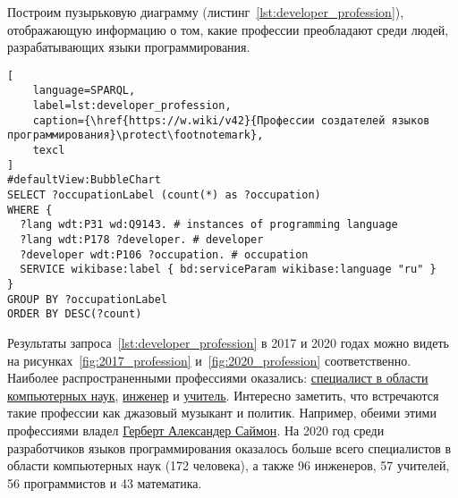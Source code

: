 \begin{marginfigure}[-102pt]
{
\setlength{\fboxsep}{0pt}
\setlength{\fboxrule}{1pt}
}
  \caption{Профессии разработчиков языков программирования, 2017 год. Размер пузырька показывает число разработчиков с соответствуюшей профессией.}
  \label{fig:2017_profession}
\end{marginfigure}
\begin{marginfigure}[-2pt]
{
\setlength{\fboxsep}{0pt}
\setlength{\fboxrule}{1pt}
}
  \caption{Профессии разработчиков языков программирования программирования, 2020 год. Размер пузырька показывает число разработчиков с соответствуюшей профессией.}
  \label{fig:2020_profession}
\end{marginfigure}
Построим пузырьковую диаграмму (листинг~\ref{lst:developer_profession}), отображающую информацию о том, какие профессии преобладают среди людей, разрабатывающих языки программирования.
\begin{lstlisting}[
	language=SPARQL,
	label=lst:developer_profession,
	caption={\href{https://w.wiki/v42}{Профессии создателей языков программирования}\protect\footnotemark},
	texcl
]
#defaultView:BubbleChart
SELECT ?occupationLabel (count(*) as ?occupation)
WHERE {
  ?lang wdt:P31 wd:Q9143. # instances of programming language 
  ?lang wdt:P178 ?developer. # developer
  ?developer wdt:P106 ?occupation. # occupation
  SERVICE wikibase:label { bd:serviceParam wikibase:language "ru" }
}
GROUP BY ?occupationLabel 
ORDER BY DESC(?count)
\end{lstlisting}

Результаты запроса~\ref{lst:developer_profession} в 2017 и 2020 годах можно видеть на рисунках~\ref{fig:2017_profession} и~\ref{fig:2020_profession} соответственно.
Наиболее распространенными профессиями оказались: \href{https://www.wikidata.org/wiki/Q21198}{специалист в области компьютерных наук}, \href{https://www.wikidata.org/wiki/Q81096}{инженер} и \href{https://www.wikidata.org/wiki/Q37226}{учитель}. Интересно заметить, что встречаются такие профессии как джазовый музыкант и политик. Например, обеими этими профессиями владел \href{https://www.wikidata.org/wiki/Q181529}{Герберт Александер Саймон}. На 2020 год среди разработчиков языков программирования оказалось больше всего специалистов в области компьютерных наук (172 человека), а также 96 инженеров, 57 учителей, 56 программистов и 43 математика.

